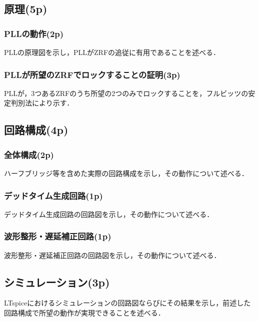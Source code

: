 \documentclass{jsarticle}
\begin{document}
\subsection{原理(5p)}
\subsubsection{PLLの動作(2p)}
PLLの原理図を示し，PLLがZRFの追従に有用であることを述べる．

\subsubsection{PLLが所望のZRFでロックすることの証明(3p)}
PLLが，3つあるZRFのうち所望の2つのみでロックすることを，フルビッツの安定判別法により示す．

\subsection{回路構成(4p)}
\subsubsection{全体構成(2p)}
ハーフブリッジ等を含めた実際の回路構成を示し，その動作について述べる．

\subsubsection{デッドタイム生成回路(1p)}
デッドタイム生成回路の回路図を示し，その動作について述べる．

\subsubsection{波形整形・遅延補正回路(1p)}
波形整形・遅延補正回路の回路図を示し，その動作について述べる．

\subsection{シミュレーション(3p)}
LTspiceにおけるシミュレーションの回路図ならびにその結果を示し，前述した回路構成で所望の動作が実現できることを述べる．
\end{document}
